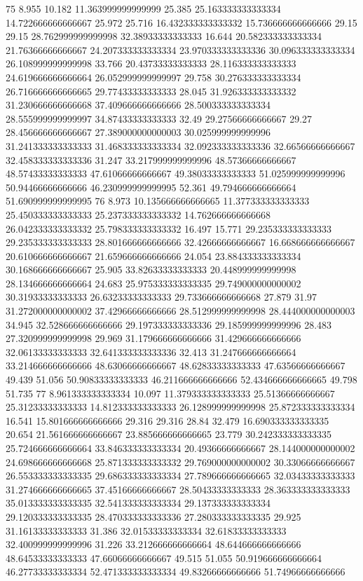 75 8.955 10.182 11.363999999999999 25.385 25.163333333333334 14.722666666666667 25.972 25.716 16.432333333333332 15.736666666666666 29.15 29.15 28.762999999999998 32.38933333333333 16.644 20.582333333333334 21.76366666666667 24.207333333333334 23.970333333333336 30.096333333333334 26.108999999999998 33.766 20.43733333333333 28.116333333333333 24.619666666666664 26.052999999999997 29.758 30.276333333333334 26.716666666666665 29.77433333333333 28.045 31.926333333333332 31.230666666666668 37.409666666666666 28.500333333333334 28.555999999999997 34.87433333333333 32.49 29.27566666666667 29.27 28.456666666666667 27.389000000000003 30.025999999999996 31.241333333333333 31.468333333333334 32.092333333333336 32.66566666666667 32.458333333333336 31.247 33.217999999999996 48.57366666666667 48.57433333333333 47.61066666666667 49.38033333333333 51.025999999999996 50.94466666666666 46.230999999999995 52.361 49.794666666666664 51.690999999999995
76 8.973 10.135666666666665 11.377333333333333 25.450333333333333 25.237333333333332 14.762666666666668 26.042333333333332 25.798333333333332 16.497 15.771 29.235333333333333 29.235333333333333 28.801666666666666 32.42666666666667 16.668666666666667 20.610666666666667 21.659666666666666 24.054 23.884333333333334 30.168666666666667 25.905 33.82633333333333 20.448999999999998 28.134666666666664 24.683 25.975333333333335 29.749000000000002 30.31933333333333 26.63233333333333 29.733666666666668 27.879 31.97 31.272000000000002 37.42966666666666 28.512999999999998 28.444000000000003 34.945 32.528666666666666 29.197333333333336 29.185999999999996 28.483 27.320999999999998 29.969 31.179666666666666 31.429666666666666 32.06133333333333 32.641333333333336 32.413 31.247666666666664 33.214666666666666 48.63066666666667 48.62833333333333 47.63566666666667 49.439 51.056 50.90833333333333 46.211666666666666 52.434666666666665 49.798 51.735
77 8.961333333333334 10.097 11.379333333333333 25.51366666666667 25.31233333333333 14.812333333333333 26.128999999999998 25.872333333333334 16.541 15.801666666666666 29.316 29.316 28.84 32.479 16.690333333333335 20.654 21.561666666666667 23.885666666666665 23.779 30.242333333333335 25.724666666666664 33.846333333333334 20.49366666666667 28.144000000000002 24.698666666666668 25.871333333333332 29.769000000000002 30.33066666666667 26.553333333333335 29.686333333333334 27.789666666666665 32.03433333333333 31.274666666666665 37.45166666666667 28.50433333333333 28.363333333333333 35.013333333333335 32.541333333333334 29.137333333333334 29.120333333333335 28.470333333333336 27.280333333333335 29.925 31.16133333333333 31.386 32.01533333333334 32.61833333333333 32.400999999999996 31.226 33.212666666666664 48.644666666666666 48.64533333333333 47.66066666666667 49.515 51.055 50.919666666666664 46.27733333333334 52.471333333333334 49.83266666666666 51.74966666666666
